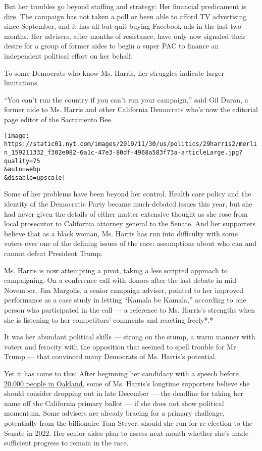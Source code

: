 But her troubles go beyond staffing and strategy: Her financial
predicament is
\href{https://www.nytimes.com/interactive/2019/10/16/us/elections/democratic-q3-fundraising.html}{dire}.
The campaign has not taken a poll or been able to afford TV advertising
since September, and it has all but quit buying Facebook ads in the last
two months. Her advisers, after months of resistance, have only now
signaled their desire for a group of former aides to begin a super PAC
to finance an independent political effort on her behalf.

To some Democrats who know Ms. Harris, her struggles indicate larger
limitations.

``You can't run the country if you can't run your campaign,'' said Gil
Duran, a former aide to Ms. Harris and other California Democrats who's
now the editorial page editor of the Sacramento Bee.

\texttt{[image: https://static01.nyt.com/images/2019/11/30/us/politics/29harris2/merlin\_159211332\_f302e082-6a1c-47e3-80df-4968a583f73a-articleLarge.jpg?quality=75\\\&auto=webp\\\&disable=upscale]}

Some of her problems have been beyond her control. Health care policy
and the identity of the Democratic Party became much-debated issues this
year, but she had never given the details of either matter extensive
thought as she rose from local prosecutor to California attorney general
to the Senate. And her supporters believe that as a black woman, Ms.
Harris has run into difficulty with some voters over one of the defining
issues of the race: assumptions about who can and cannot defeat
President Trump.

Ms. Harris is now attempting a pivot, taking a less scripted approach to
campaigning. On a conference call with donors after the last debate in
mid-November, Jim Margolis, a senior campaign adviser, pointed to her
improved performance as a case study in letting ``Kamala be Kamala,''
according to one person who participated in the call --- a reference to
Ms. Harris's strengths when she is listening to her competitors'
comments and reacting freely*.*

It was her abundant political skills --- strong on the stump, a warm
manner with voters and ferocity with the opposition that seemed to spell
trouble for Mr. Trump --- that convinced many Democrats of Ms. Harris's
potential.

Yet it has come to this: After beginning her candidacy with a speech
before
\href{https://www.nytimes.com/2019/01/27/us/politics/kamala-harris-rally-2020.html}{20,000
people in Oakland}, some of Ms. Harris's longtime supporters believe she
should consider dropping out in late December --- the deadline for
taking her name off the California primary ballot --- if she does not
show political momentum. Some advisers are already bracing for a primary
challenge, potentially from the billionaire Tom Steyer, should she run
for re-election to the Senate in 2022. Her senior aides plan to assess
next month whether she's made sufficient progress to remain in the race.

